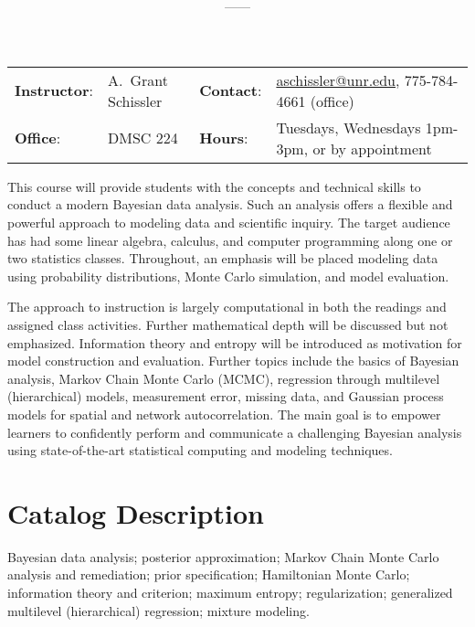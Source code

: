 \documentclass[11pt,onecolumn]{article}
\title{\textbf{\coursename}}
\author{{\semester}---{\roomnumb}---{\classtimes}}
\date{}
\makeatletter
\newcommand{\myname}{A.~Grant Schissler}
\newcommand{\myemail}{aschissler@unr.edu}
\newcommand{\office}{DMSC 224}
\newcommand{\officehours}{Tuesdays, Wednesdays 1pm-3pm, or by appointment}
\makeatother
\begin{document}
\maketitle

\vspace{-0.25in}
\noindent\makebox[\linewidth]{\rule{\textwidth}{1pt}}

\begin{center}
\begin{tabular}{llll}
\textbf{Instructor}:&\myname & \textbf{Contact}:&\href{mailto:\myemail}{\myemail}, 775-784-4661 (office)\\
\textbf{Office}:&\office & \textbf{Hours}:&\officehours\\
\end{tabular}
\end{center}

This course will provide students with the concepts and technical skills to conduct a modern Bayesian data analysis. Such an analysis offers a flexible and powerful approach to modeling data and scientific inquiry. The target audience has had some linear algebra, calculus, and computer programming along one or two statistics classes. Throughout, an emphasis will be placed modeling data using probability distributions, Monte Carlo simulation, and model evaluation. 

The approach to instruction is largely computational in both the readings and assigned class activities. Further mathematical depth will be discussed but not emphasized. Information theory and entropy will be introduced as motivation for model construction and evaluation. Further topics include the basics of Bayesian analysis, Markov Chain Monte Carlo (MCMC), regression through multilevel (hierarchical) models, measurement error, missing data, and Gaussian process models for spatial and network autocorrelation. The main goal is to empower learners to confidently perform and communicate a challenging Bayesian analysis using state-of-the-art statistical computing and modeling techniques.

\section*{Catalog Description}
Bayesian data analysis; posterior approximation; Markov Chain Monte Carlo analysis and remediation; prior specification; Hamiltonian Monte Carlo; information theory and criterion; maximum entropy; regularization; generalized multilevel (hierarchical) regression; mixture modeling.
\end{document}
